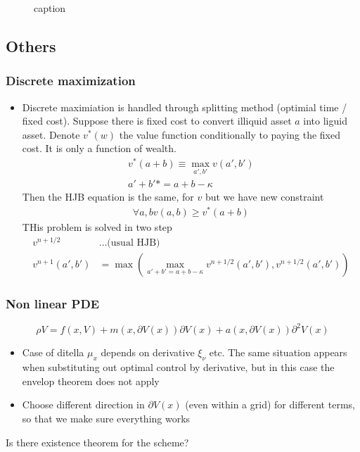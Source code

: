 \documentclass[english]{article}
\begin{document}
\begin{itemize}
\begin{itemize}
\begin{itemize}
\begin{figure}[htp]
				\caption{\label{image2015831195641.png}caption}
			\end{figure}
		\end{itemize}
	\end{itemize}
\end{itemize}

\subsection{Others}

\subsubsection{Discrete maximization}

\begin{itemize}
	\item  Discrete maximiation is handled through splitting method (optimial time / fixed cost).	Suppose there is fixed cost to convert illiquid asset $a$ into liguid asset.	Denote $v^*(w)$ the value function conditionally to paying the fixed cost. It is only a function of wealth.
	\begin{align*}
		v^*(a+b) \equiv \max_{a', b'} v(a', b') \\
		a' + b' * = a + b - \kappa
	\end{align*}
	Then the HJB equation is the same, for $v$ but we have new constraint
	\begin{align*}
		\forall a, b	v(a, b) \geq v^*(a + b)
	\end{align*}
	THis problem is solved in two step
	\begin{align*}
		v^{n+1/2} &\dots \text{(usual HJB)}\\
		v^{n+1}(a', b') &= \max(\max_{a' + b' = a + b - \kappa} v^{n+1/2} (a', b'), v^{n+1/2}(a', b'))
	\end{align*}
\end{itemize}

\subsubsection{Non linear PDE}
$$\rho V = f(x, V) + m(x, \partial V(x)) \partial V(x)+ a(x, \partial V(x)) \partial^2 V(x)$$

\begin{itemize}
	\item Case of ditella $\mu_x$ depends on derivative $\xi_\nu$ etc. The same situation appears when substituting out optimal control by derivative, but in this case the envelop theorem does not apply
	\item Choose different direction in $\partial V(x)$ (even within a grid) for different terms, so that we make sure everything works
\end{itemize}
Is there existence theorem for the scheme?
\end{document}
